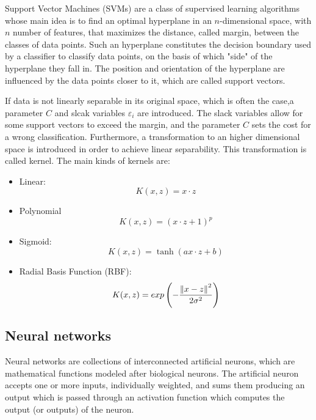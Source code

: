\documentclass[journal,twocolumn]{IEEEtran}
\begin{document}
Support Vector Machines (SVMs) are a class of supervised learning algorithms whose main idea is to find an optimal hyperplane in an $n$-dimensional space, with $n$ number of features, that maximizes the distance, called margin, between the classes of data points. Such an hyperplane constitutes the decision boundary used by a classifier to classify data points, on the basis of which "side" of the hyperplane they fall in. The position and orientation of the hyperplane are influenced by the data points closer to it, which are called support vectors.

If data is not linearly separable in its original space, which is often the case,a parameter $C$ and slcak variables $\varepsilon_i$ are introduced. The slack variables allow for some support vectors to exceed the margin, and the parameter $C$ sets the cost for a wrong classification. Furthermore, a transformation to an higher dimensional space is introduced in order to achieve linear separability. This transformation is called kernel.
The main kinds of kernels are:
\begin{itemize}
\item Linear:
\begin{equation*}
K(x,z) = x\cdot z
\end{equation*}
\item Polynomial 
\begin{equation*}
K(x,z)=(x\cdot z + 1)^p
\end{equation*}
\item Sigmoid:
\begin{equation*}
K(x,z)=\tanh(ax\cdot z+b)
\end{equation*}
\item Radial Basis Function (RBF):
\begin{equation*}
K(x,z)=exp\left(-\frac{\norm{x-z}^2}{2\sigma^2}\right)
\end{equation*}
\end{itemize}

\subsection{Neural networks}

Neural networks are collections of interconnected artificial neurons, which are mathematical functions modeled after biological neurons. The artificial neuron accepts one or more inputs, individually weighted, and sums them producing an output which is passed through an activation function which computes the output (or outputs) of the neuron.
\end{document}
